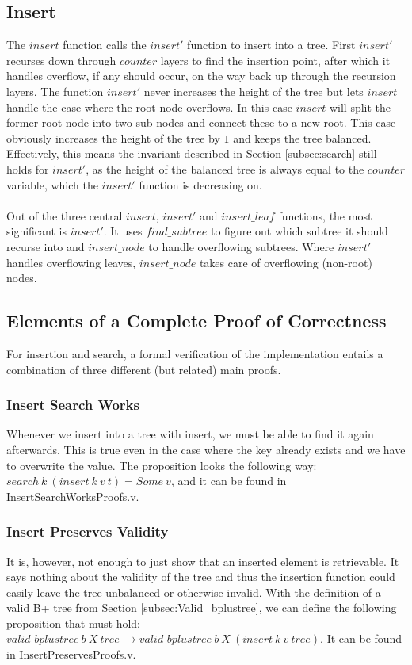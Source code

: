 \subsection{Insert}
The $insert$ function calls the $insert'$ function to insert into a tree. First $insert'$ recurses down through $counter$ layers to find the insertion point, after which it handles overflow, if any should occur, on the way back up through the recursion layers. The function $insert'$ never increases the height of the tree but lets $insert$ handle the case where the root node overflows. In this case $insert$ will split the former root node into two sub nodes and connect these to a new root. This case obviously increases the height of the tree by $1$ and keeps the tree balanced. Effectively, this means the invariant described in Section \ref{subsec:search} still holds for $insert'$, as the height of the balanced tree is always equal to the $counter$ variable, which the $insert'$ function is decreasing on.

\paragraph{}
Out of the three central $insert$, $insert'$ and $insert\_leaf$ functions, the most significant is $insert'$. It uses $find\_subtree$ to figure out which subtree it should recurse into and $insert\_node$ to handle overflowing subtrees. Where $insert'$ handles overflowing leaves, $insert\_node$ takes care of overflowing (non-root) nodes.

\subsection{Elements of a Complete Proof of Correctness}
\label{sec:ElementsOfACompleteProof}
For insertion and search, a formal verification of the implementation entails a combination of three different (but related) main proofs.

\subsubsection{Insert Search Works}
Whenever we insert into a tree with insert, we must be able to find it again afterwards. This is true even in the case where the key already exists and we have to overwrite the value. The proposition looks the following way: $search\ k\ (insert\ k\ v\ t) = Some\ v$, and it can be found in InsertSearchWorksProofs.v.

\subsubsection{Insert Preserves Validity}
It is, however, not enough to just show that an inserted element is retrievable. It says nothing about the validity of the tree and thus the insertion function could easily leave the tree unbalanced or otherwise invalid. With the definition of a valid B+ tree from Section \ref{subsec:Valid_bplustree}, we can define the following proposition that must hold: $valid\_bplustree\ b\ X\ tree\ \rightarrow valid\_bplustree\ b\ X\ (insert\ k\ v\ tree)$. It can be found in InsertPreservesProofs.v.

